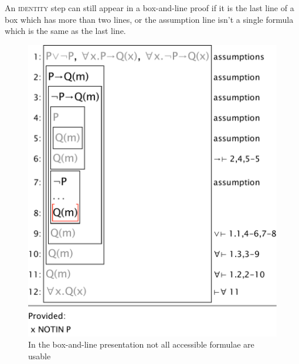 An \textsc{identity} step can still appear in a box-and-line proof if it is the last line of a box which has more than two lines, or the assumption line isn't a single formula which is the same as the last line.

\begin{figure}
\begin{center}
\includegraphics[scale=0.5]{pics/sampleboxNlinegreyed}
\caption{In the box-and-line presentation not all accessible formulae are usable}
\label{fig:sampleboxNlinegreyed}
\end{center}
\end{figure}

